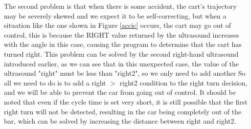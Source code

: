 \documentclass[12pt, a4paper, oneside]{report}
\begin{document}
The second problem is that when there is some accident, the cart's trajectory may be severely skewed and we expect it to be self-correcting, but when a situation like the one shown in Figure \ref{accic} occurs, the cart may go out of control, this is because the RIGHT value returned by the ultrasound increases with the angle in this case, causing the program to determine that the cart has turned right. This problem can be solved by the second right-hand ultrasound introduced earlier, as we can see that in this unexpected case, the value of the ultrasound "right" must be less than "right2", so we only need to add another So all we need to do is to add a right $>$ right2 condition to the right turn decision, and we will be able to prevent the car from going out of control. It should be noted that even if the cycle time is set very short, it is still possible that the first right turn will not be detected, resulting in the car being completely out of the bar, which can be solved by increasing the distance between right and right2.
\end{document}
